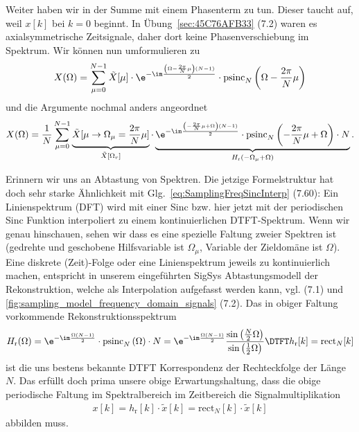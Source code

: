 \begin{ExCalc}
Weiter haben wir in der Summe mit einem Phasenterm zu tun. Dieser
taucht auf, weil $x[k]$ bei $k=0$ beginnt.
In Übung~\ref{sec:45C76AFB33} (7.2) waren es axialsymmetrische Zeitsignale,
daher dort keine Phasenverschiebung im Spektrum.
%
Wir können nun umformulieren zu
%
\begin{equation}
\label{eq:6337B75DF2_DFT2DTFT}
X(\Omega)=\sum_{\mu=0}^{N-1}\tilde{X}[\mu]\cdot\e^{-\im\frac{\left(\Omega-\frac{2\pi}{N}\mu\right)(N-1)}{2}}\cdot\text{psinc}_N\left(\Omega-\frac{2\pi}{N}\mu\right)
\end{equation}
und die Argumente nochmal anders angeordnet
\begin{equation}
X(\Omega)=\frac{1}{N}\sum_{\mu=0}^{N-1} \underbrace{\tilde{X}[\mu\rightarrow \Omega_\mu = \frac{2\pi}{N} \mu]}_{\tilde{X}[\Omega_r]}\cdot
\underbrace{\e^{-\im\frac{\left(-\frac{2\pi}{N}\mu+\Omega\right)(N-1)}{2}}\cdot\text{psinc}_N\left(-\frac{2\pi}{N}\mu + \Omega\right)\cdot N}_{H_\mathrm{r}\left(-\Omega_\mu+\Omega\right)}.
\end{equation}

Erinnern wir uns an Abtastung von Spektren. Die
jetzige Formelstruktur hat doch sehr starke Ähnlichkeit mit Glg.~\eqref{eq:SamplingFreqSincInterp} (7.60):
Ein Linienspektrum (DFT) wird mit einer Sinc bzw. hier jetzt mit der periodischen
Sinc Funktion interpoliert zu einem kontinuierlichen DTFT-Spektrum.
Wenn wir genau hinschauen, sehen wir dass es eine spezielle Faltung zweier
Spektren ist (gedrehte und geschobene Hilfsvariable ist $\Omega_\mu$, Variable der
Zieldomäne ist $\Omega$).
%
Eine diskrete (Zeit)-Folge oder eine Linienspektrum jeweils zu kontinuierlich
machen, entspricht in unserem eingeführten
SigSys Abtastungsmodell der Rekonstruktion, welche als Interpolation
aufgefasst werden kann, vgl.  (7.1) und
\ref{fig:sampling_model_frequency_domain_signals} (7.2).
Das in obiger Faltung vorkommende Rekonstruktionsspektrum
\begin{align}
H_\mathrm{r}(\Omega) =
\e^{-\im\frac{\Omega(N-1)}{2}}\cdot\text{psinc}_N\left(\Omega\right)\cdot N =
\e^{-\im\frac{\Omega(N-1)}{2}}
\frac{\sin\left(\frac{N}{2}\Omega\right)}{\sin\left(\frac{1}{2}\Omega\right)}
\DTFT
h_\mathrm{r}[k] = \mathrm{rect}_N[k]
\end{align}
ist die uns bestens bekannte DTFT Korrespondenz der Rechteckfolge der Länge $N$.
Das erfüllt doch prima unsere obige Erwartungshaltung, dass die obige periodische
Faltung im Spektralbereich im Zeitbereich die Signalmultiplikation
\begin{align}
x[k] = h_\mathrm{r}[k]  \cdot \tilde{x}[k] = \mathrm{rect}_N[k] \cdot \tilde{x}[k]
\end{align}
abbilden muss.

\end{ExCalc}
